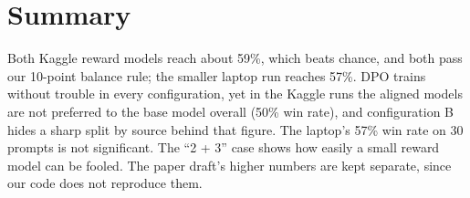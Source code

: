 \section{Summary}
Both Kaggle reward models reach about 59\%, which beats chance, and both pass our 10-point balance rule; the smaller laptop run reaches 57\%. DPO trains without trouble in every configuration, yet in the Kaggle runs the aligned models are not preferred to the base model overall (50\% win rate), and configuration B hides a sharp split by source behind that figure. The laptop's 57\% win rate on 30 prompts is not significant. The ``2 + 3'' case shows how easily a small reward model can be fooled. The paper draft's higher numbers are kept separate, since our code does not reproduce them.
